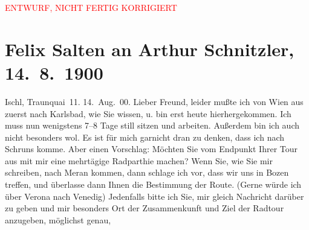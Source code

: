 
\begin{center}
            \textcolor{red}{ENTWURF, NICHT FERTIG KORRIGIERT}
                      \end{center}
            
         
         \renewcommand{\erwaehntePersonen}{Personen: Oskar Mayer}
         \renewcommand{\erwaehnteOrte}{Orte: Ala, Bad Ischl, Bludenz, Bozen, Innsbruck, Karlsbad, Meran, Schruns, Schweiz, Traunkai, Triest, Venedig, Verona, Wien}
         \renewcommand{\erwaehnteWerke}{}
               \section[Felix Salten an Arthur Schnitzler, 14. 8. 1900]{ Felix Salten an Arthur Schnitzler, 14. 8. 1900}\nopagebreak{}\rehead{ }\begin{ledgroupsized}[t]{13cm}\normalsize\beginnumbering \toendnotes[C]{\smallbreak\pagebreak[2]} 
\toendnotes[C]{\smallbreak}\pstart
           \raggedleft{}{\pb}Ischl, Traunquai 11. \pend
           \pstart
           \raggedleft{}14. Aug. 00. \pend
           \pstart
           Lieber Freund, leider mußte ich von Wien aus zuerst nach Karlsbad, wie Sie
               wissen, u. bin erst heute hierhergekommen. Ich muss nun wenigstens 7–8 Tage still
               sitzen und arbeiten. Außerdem bin ich auch nicht besonders wol. Es ist für mich
               garnicht dran zu denken, dass ich nach Schruns komme.
               Aber einen Vorschlag: Möchten Sie vom Endpunkt Ihrer Tour aus mit mir eine mehrtägige
               Radparthie machen? Wenn Sie, wie Sie mir schreiben, nach Meran kommen, dann schlage ich vor, dass wir uns in Bozen treffen, und überlasse dann Ihnen die Bestimmung der
               Route. (Gerne {\pb}würde ich über
               Verona nach Venedig) Jedenfalls bitte ich Sie, mir gleich Nachricht darüber zu geben und
               mir besonders Ort der Zusammenkunft und Ziel der Radtour anzugeben, möglichst genau,

\end{ledgroupsized}

